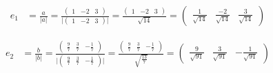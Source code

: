 \documentclass[12pt, fleqn, leqno]{extreport}
\begin{document}
\begin{equation}
    \begin{split}
        e_{1} &= \frac{a}{\vert a \vert} =
        \frac{
            \begin{pmatrix}
                1 & -2 & 3
            \end{pmatrix}
        }{
            \vert
            \begin{pmatrix}
                1 & -2 & 3
            \end{pmatrix}
            \vert
        } =
        \frac{
            \begin{pmatrix}
                1 & -2 & 3
            \end{pmatrix}
        }{
            \sqrt{14}
        } =
        \begin{pmatrix}
            \frac{1}{\sqrt{14}} & \frac{-2}{\sqrt{14}} & \frac{3}{\sqrt{14}}
        \end{pmatrix}
    \end{split}
\end{equation}

\begin{equation}
    \begin{split}
        e_{2} &= \frac{b}{\vert b \vert} =
        \frac{
            \begin{pmatrix}
                \frac{9}{7} & \frac{3}{7} & -\frac{1}{7}
            \end{pmatrix}
        }{
            \vert
            \begin{pmatrix}
                \frac{9}{7} & \frac{3}{7} & -\frac{1}{7}
            \end{pmatrix}
            \vert
        } =
        \frac{
            \begin{pmatrix}
                \frac{9}{7} & \frac{3}{7} & -\frac{1}{7}
            \end{pmatrix}
        }{
            \sqrt{\frac{13}{7}}
        } =
        \begin{pmatrix}
            \frac{9}{\sqrt{91}} & \frac{3}{\sqrt{91}} & -\frac{1}{\sqrt{91}}
        \end{pmatrix}
    \end{split}
\end{equation}
\end{document}
